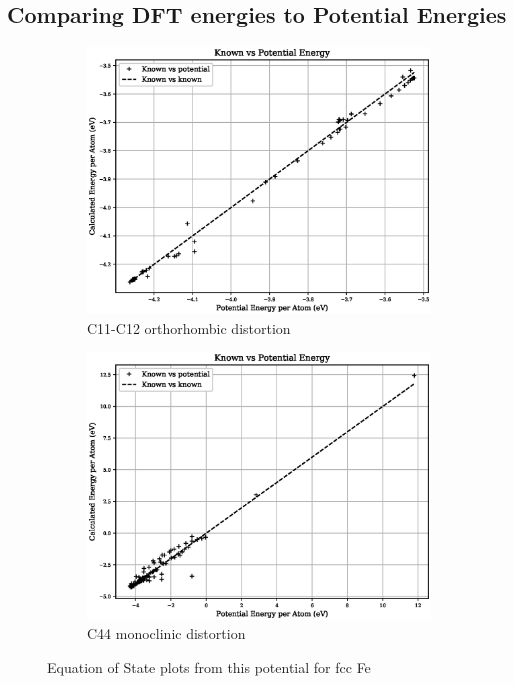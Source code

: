 \subsection{Comparing DFT energies to Potential Energies}

\begin{figure}[htb]
\begin{subfigure}{.42\textwidth}
  \centering
  \includegraphics[width=.94\linewidth]{chapters/potentials_fe_pd_ru/fepd_potential/potential_known_energy_fit_set.eps}  
  \caption{C11-C12 orthorhombic distortion}
  \label{fig:fepd-fefcc-rose}
\end{subfigure}
\begin{subfigure}{.42\textwidth}
  \centering
  \includegraphics[width=.94\linewidth]{chapters/potentials_fe_pd_ru/fepd_potential/potential_known_energy_full_set.eps}  
  \caption{C44 monoclinic distortion}
  \label{fig:fepd-fefcc-bmeos}
\end{subfigure}
\label{fig:fig:fepd-fefcc-equation-of-state}
\caption{Equation of State plots from this potential for \acrshort{fcc} Fe}
\end{figure}





